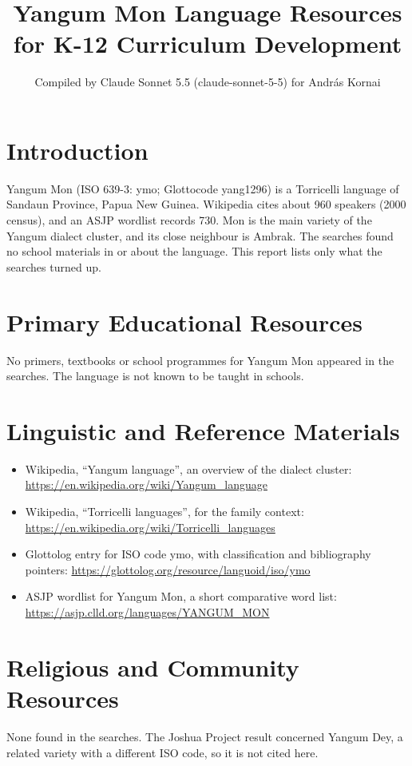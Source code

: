 \documentclass[12pt]{article}
\title{Yangum Mon Language Resources for K-12 Curriculum Development}
\author{Compiled by Claude Sonnet 5.5 (claude-sonnet-5-5) for Andr\'as Kornai}
\date{}
\begin{document}
\maketitle

\section{Introduction}
Yangum Mon (ISO 639-3: ymo; Glottocode yang1296) is a Torricelli language of Sandaun Province, Papua New Guinea. Wikipedia cites about 960 speakers (2000 census), and an ASJP wordlist records 730. Mon is the main variety of the Yangum dialect cluster, and its close neighbour is Ambrak. The searches found no school materials in or about the language. This report lists only what the searches turned up.

\section{Primary Educational Resources}
No primers, textbooks or school programmes for Yangum Mon appeared in the searches. The language is not known to be taught in schools.

\section{Linguistic and Reference Materials}
\begin{itemize}
\item Wikipedia, ``Yangum language'', an overview of the dialect cluster: \url{https://en.wikipedia.org/wiki/Yangum_language}
\item Wikipedia, ``Torricelli languages'', for the family context: \url{https://en.wikipedia.org/wiki/Torricelli_languages}
\item Glottolog entry for ISO code ymo, with classification and bibliography pointers: \url{https://glottolog.org/resource/languoid/iso/ymo}
\item ASJP wordlist for Yangum Mon, a short comparative word list: \url{https://asjp.clld.org/languages/YANGUM_MON}
\end{itemize}

\section{Religious and Community Resources}
None found in the searches. The Joshua Project result concerned Yangum Dey, a related variety with a different ISO code, so it is not cited here.
\end{document}

